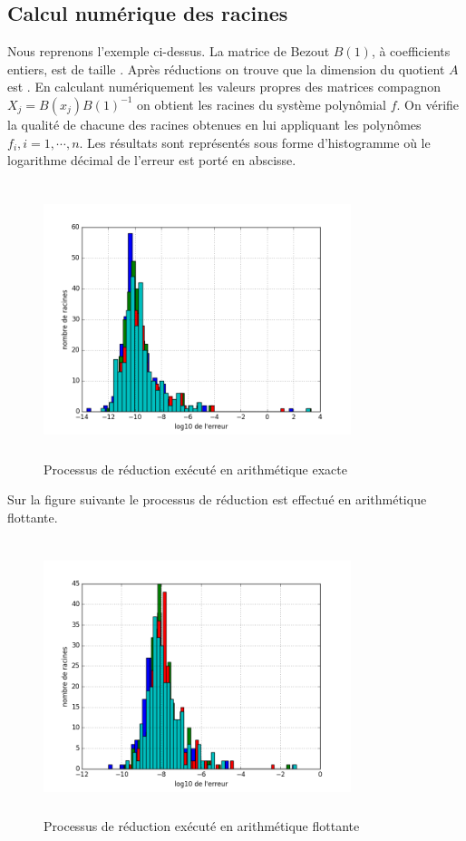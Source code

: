 \documentclass{standalone}
\begin{document}
  \subsection{Calcul numérique des racines}
  Nous reprenons l'exemple ci-dessus. La matrice de Bezout $B(1)$, à coefficients entiers, est de taille . Après réductions on trouve que la dimension du quotient $A$ est . En calculant numériquement les valeurs propres des matrices compagnon $X_j = B(x_j)B(1)^{-1}$ on obtient les racines du système polynômial $f$. On vérifie la qualité de chacune des racines obtenues en lui appliquant les polynômes $f_i, i=1,\cdots,n$. Les résultats sont représentés sous forme d'histogramme o\`u le logarithme décimal de l'erreur est porté en abscisse.
\begin{figure}[!ht]
  \centering
    \caption{Processus de réduction exécuté en arithmétique exacte}
  \includegraphics[height=8cm, width=0.8\textwidth]{../png/sage_roots.png}
\end{figure}
 Sur la figure suivante le processus de réduction est effectué en arithmétique flottante.
 \begin{figure}[!ht]
   \centering
     \caption{Processus de réduction exécuté en arithmétique flottante}
   \includegraphics[height=8cm, width=0.8\textwidth]{../png/octave_roots.png}
 \end{figure}
\end{document}
